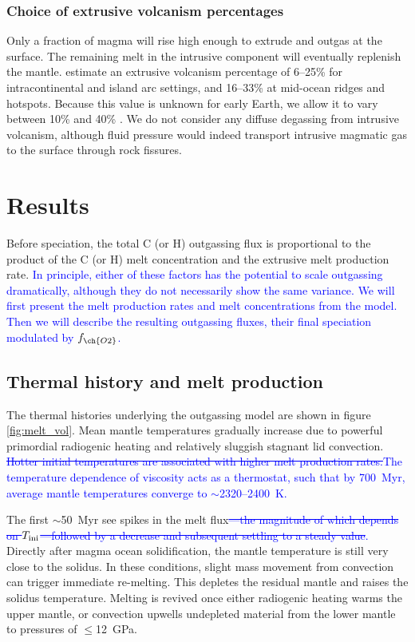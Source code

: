 \documentclass[3p,authoryear]{elsarticle}
\newcommand{\editthree}[2]{\textcolor{blue}{\sout{#1}#2}}
\begin{document}
\subsubsection{Choice of extrusive volcanism percentages}

Only a fraction of magma will rise high enough to extrude and outgas at the surface. The remaining melt in the intrusive component will eventually replenish the mantle. \citet{Crisp1984} estimate an extrusive volcanism percentage of 6--25\% for intracontinental and island arc settings, and 16--33\% at mid-ocean ridges and hotspots. Because this value is unknown for early Earth, we allow it to vary between 10\% and 40\% \citep{Grott2011}. We do not consider any diffuse degassing from intrusive volcanism, although fluid pressure would indeed transport intrusive magmatic gas to the surface through rock fissures.  






\section{Results}

Before speciation, the total C (or H) outgassing flux is proportional to the product of the C (or H) melt concentration and the extrusive melt production rate. \editthree{}{In principle, either of these factors has the potential to scale outgassing dramatically, although they do not necessarily show the same variance. We will first present the melt production rates and melt concentrations from the model. Then we will describe the resulting outgassing fluxes, their final speciation modulated by $f_{\ch{O2}}$.} 


\subsection{Thermal history and melt production}




The thermal histories underlying the outgassing model are shown in figure \ref{fig:melt_vol}. Mean mantle temperatures gradually increase due to powerful primordial radiogenic heating and relatively sluggish stagnant lid convection. \editthree{Hotter initial temperatures are associated with higher melt production rates.}{The temperature dependence of viscosity acts as a thermostat, such that by 700~Myr, average mantle temperatures converge to $\sim$2320--2400~K.} 

The first $\sim$50~Myr see spikes in the melt flux\editthree{---the magnitude of which depends on $T_{\rm ini}$---followed by a decrease and subsequent settling to a steady value}. Directly after magma ocean solidification, the mantle temperature is still very close to the solidus. In these conditions, slight mass movement from convection can trigger immediate re-melting. This depletes the residual mantle and raises the solidus temperature. Melting is revived once either radiogenic heating warms the upper mantle, or convection upwells undepleted material from the lower mantle to pressures of $\le$12~GPa. 
\end{document}
